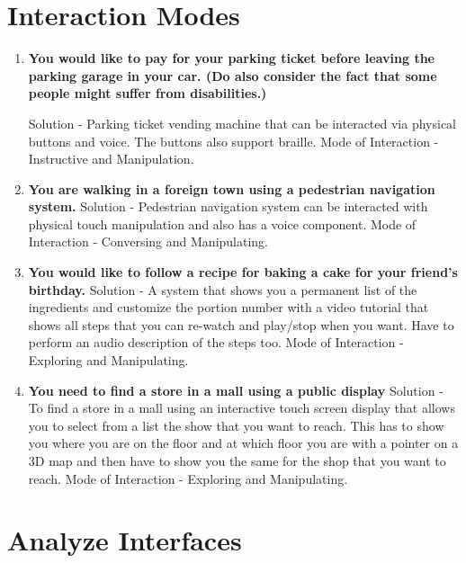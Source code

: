 \documentclass[10pt]{scrartcl}
\begin{document}
\section{Interaction Modes }

\begin{enumerate}
	\item \textbf{You would like to pay for your parking ticket before leaving the parking garage in your car. (Do also consider the fact that some people might suffer from disabilities.)}
	
	Solution - Parking ticket vending machine that can be interacted via physical buttons and voice. The buttons also support braille. Mode of Interaction - Instructive and Manipulation.
	
	\item \textbf{You are walking in a foreign town using a pedestrian navigation system.}
	Solution - Pedestrian navigation system can be interacted with physical touch manipulation and also has a voice component. Mode of Interaction - Conversing and Manipulating.
	
	\item \textbf{You would like to follow a recipe for baking a cake for your friend’s birthday.}
	Solution - A system that shows you a permanent list of the ingredients and customize the portion number with a video tutorial that shows all steps that you can re-watch and play/stop when you want. Have to perform an audio description of the steps too. Mode of Interaction - Exploring and Manipulating.
	
	\item \textbf{You need to find a store in a mall using a public display}
	Solution - To find a store in a mall using an interactive touch screen display that allows you to select from a list the show that you want to reach. This has to show you where you are on the floor and at which floor you are with a pointer on a 3D map and then have to show you the same for the shop that you want to reach. Mode of Interaction - Exploring and Manipulating.
\end{enumerate}





\section{Analyze Interfaces}
\end{document}
